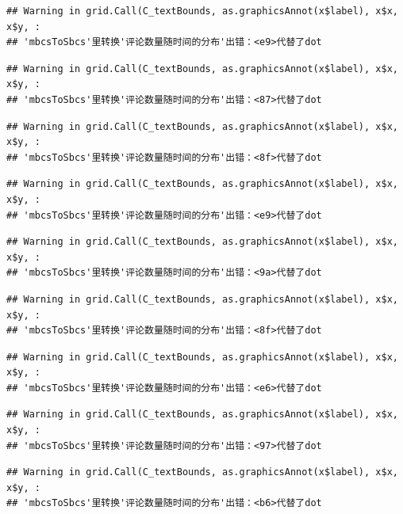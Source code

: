 \documentclass[
]{article}
\begin{document}
\begin{verbatim}
## Warning in grid.Call(C_textBounds, as.graphicsAnnot(x$label), x$x, x$y, :
## 'mbcsToSbcs'里转换'评论数量随时间的分布'出错：<e9>代替了dot
\end{verbatim}

\begin{verbatim}
## Warning in grid.Call(C_textBounds, as.graphicsAnnot(x$label), x$x, x$y, :
## 'mbcsToSbcs'里转换'评论数量随时间的分布'出错：<87>代替了dot
\end{verbatim}

\begin{verbatim}
## Warning in grid.Call(C_textBounds, as.graphicsAnnot(x$label), x$x, x$y, :
## 'mbcsToSbcs'里转换'评论数量随时间的分布'出错：<8f>代替了dot
\end{verbatim}

\begin{verbatim}
## Warning in grid.Call(C_textBounds, as.graphicsAnnot(x$label), x$x, x$y, :
## 'mbcsToSbcs'里转换'评论数量随时间的分布'出错：<e9>代替了dot
\end{verbatim}

\begin{verbatim}
## Warning in grid.Call(C_textBounds, as.graphicsAnnot(x$label), x$x, x$y, :
## 'mbcsToSbcs'里转换'评论数量随时间的分布'出错：<9a>代替了dot
\end{verbatim}

\begin{verbatim}
## Warning in grid.Call(C_textBounds, as.graphicsAnnot(x$label), x$x, x$y, :
## 'mbcsToSbcs'里转换'评论数量随时间的分布'出错：<8f>代替了dot
\end{verbatim}

\begin{verbatim}
## Warning in grid.Call(C_textBounds, as.graphicsAnnot(x$label), x$x, x$y, :
## 'mbcsToSbcs'里转换'评论数量随时间的分布'出错：<e6>代替了dot
\end{verbatim}

\begin{verbatim}
## Warning in grid.Call(C_textBounds, as.graphicsAnnot(x$label), x$x, x$y, :
## 'mbcsToSbcs'里转换'评论数量随时间的分布'出错：<97>代替了dot
\end{verbatim}

\begin{verbatim}
## Warning in grid.Call(C_textBounds, as.graphicsAnnot(x$label), x$x, x$y, :
## 'mbcsToSbcs'里转换'评论数量随时间的分布'出错：<b6>代替了dot
\end{verbatim}
\end{document}
